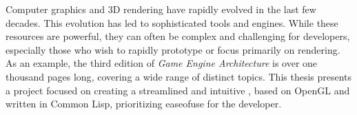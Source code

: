 Computer graphics and 3D rendering have rapidly evolved in the last few decades.
This evolution has led to sophisticated tools and engines.
While these resources are powerful,
they can often be complex and challenging for developers,
especially those who wish to rapidly prototype or focus primarily on rendering.
As an example,
the third edition of \textit{Game Engine Architecture} is over one thousand pages long\cite{gameengine_arch},
covering a wide range of distinct topics.
This thesis presents a project focused on creating a streamlined and intuitive ,
based on OpenGL and written in Common Lisp,
prioritizing ease\-of\-use for the developer. 
